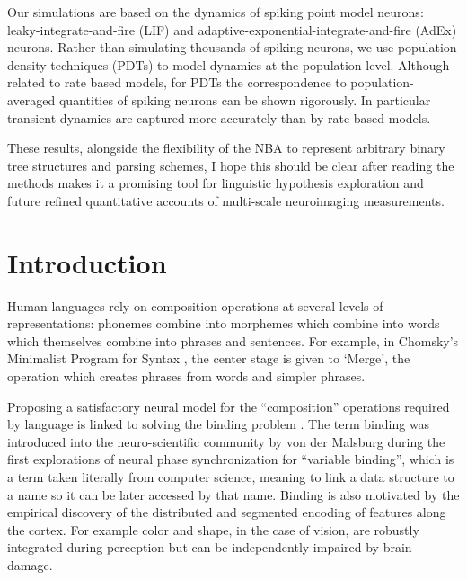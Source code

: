 \documentclass[10pt]{article}
\newcommand{\notenewMdK}[2]{}
\newcommand{\notenewMP}[3]{(MP: \textcolor{blue}{#1})}
\begin{document}
Our simulations are based on the dynamics of spiking point model neurons: leaky-integrate-and-fire (LIF) and adaptive-exponential-integrate-and-fire (AdEx) neurons.
Rather than simulating thousands of spiking neurons, we use population density techniques (PDTs) to model dynamics at the population level. Although related to rate based models, 
for PDTs the correspondence to population-averaged quantities of spiking neurons can be shown rigorously.
In particular transient dynamics are captured more accurately than by rate based models.

These results, alongside the flexibility of the NBA to represent arbitrary binary tree structures and parsing schemes, \notenewMdK{This is a strong statement that needs justification later in the paper.} \notenewMP{I hope this should be clear after reading the methods}
makes it a promising tool for linguistic hypothesis exploration and future refined quantitative accounts of multi-scale neuroimaging measurements.


\section{Introduction}

{\label{931947}}

Human languages rely on composition operations at several levels of representations: phonemes combine into morphemes which combine into words which themselves combine into 
phrases and sentences. For example, in Chomsky's Minimalist Program for Syntax \cite{Chomsky_2013}, the center stage is given to `Merge', the operation which creates phrases from words and simpler phrases.

Proposing a satisfactory neural model for the ``composition'' operations required by language is linked to solving the binding problem \cite{marcus14}.
The term binding was introduced into the neuro-scientific community by von der Malsburg\cite{von_der_Malsburg_1994} during the first explorations of neural phase synchronization for ``variable binding'', which is a term taken literally from computer science, meaning to link a data structure to a name so it can be later accessed by that name.
Binding is also motivated by the empirical discovery of the distributed and segmented encoding of features along the cortex. For example color and shape, in the case of vision, are robustly integrated during perception but can be independently impaired by brain damage.
\end{document}
